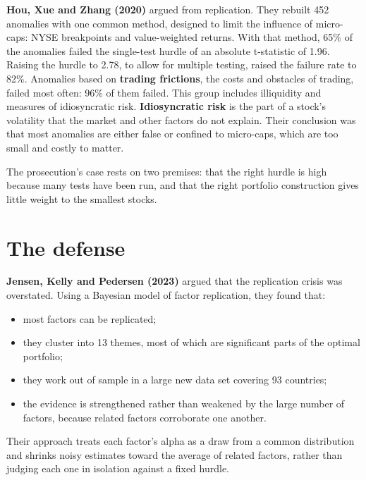 \textbf{Hou, Xue and Zhang (2020)} argued from replication. They rebuilt 452 anomalies with one common method, designed to limit the influence of micro-caps: NYSE breakpoints and value-weighted returns. With that method, 65\% of the anomalies failed the single-test hurdle of an absolute t-statistic of 1.96. Raising the hurdle to 2.78, to allow for multiple testing, raised the failure rate to 82\%. Anomalies based on \textbf{trading frictions}, the costs and obstacles of trading, failed most often: 96\% of them failed. This group includes illiquidity and measures of idiosyncratic risk. \textbf{Idiosyncratic risk} is the part of a stock's volatility that the market and other factors do not explain. Their conclusion was that most anomalies are either false or confined to micro-caps, which are too small and costly to matter.

The prosecution's case rests on two premises: that the right hurdle is high because many tests have been run, and that the right portfolio construction gives little weight to the smallest stocks.

\section{The defense}
\label{sec:19-defense}

\textbf{Jensen, Kelly and Pedersen (2023)} argued that the replication crisis was overstated. Using a Bayesian model of factor replication, they found that:

\begin{itemize}
  \item most factors can be replicated;
  \item they cluster into 13 themes, most of which are significant parts of the optimal portfolio;
  \item they work out of sample in a large new data set covering 93 countries;
  \item the evidence is strengthened rather than weakened by the large number of factors, because related factors corroborate one another.
\end{itemize}

Their approach treats each factor's alpha as a draw from a common distribution and shrinks noisy estimates toward the average of related factors, rather than judging each one in isolation against a fixed hurdle.

